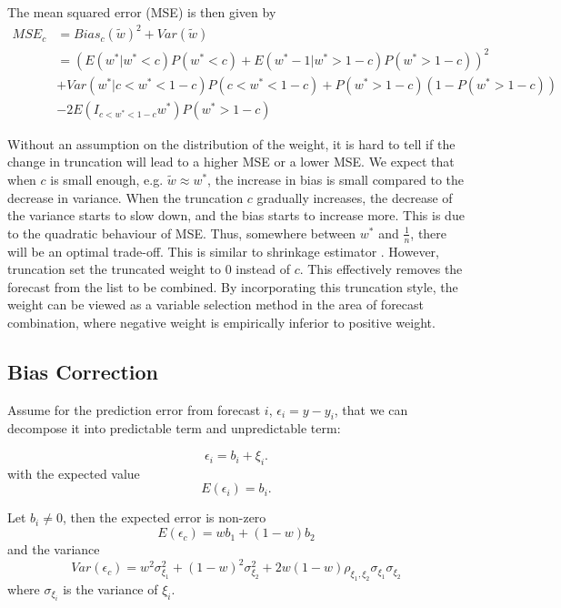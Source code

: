 \documentclass[11pt]{article}
\begin{document}
The mean squared error (MSE) is then given by 
\begin{equation}
\label{eqn: MSE trunc}
\begin{aligned}
MSE_c &= Bias_c(\tilde{w})^2 + Var(\tilde{w})\\
&=(E(w^*|w^*<c)P(w^*<c) + E(w^*-1|w^*>1-c)P(w^*>1-c))^2 \\
&+ Var(w^*|c<w^*<1-c)P(c<w^*<1-c) + P(w^*>1-c)(1-P(w^*>1-c)) \\
&- 2E(I_{c<w^*<1-c}w^*)P(w^*>1-c)
\end{aligned}
\end{equation}

Without an assumption on the distribution of the weight, it is hard to tell if the change in truncation will lead to a higher MSE or a lower MSE. We expect that when $c$ is small enough, e.g. $\tilde{w}\approx w^*$, the increase in bias is small compared to the decrease in variance. When the truncation $c$ gradually increases, the decrease of the variance starts to slow down, and the bias starts to increase more. This is due to the quadratic behaviour of MSE. Thus, somewhere between $w^*$ and $\frac{1}{n}$, there will be an optimal trade-off. This is similar to shrinkage estimator \citep{James1961}. However, truncation set the truncated weight to 0 instead of $c$. This effectively removes the forecast from the list to be combined. By incorporating this truncation style, the weight can be viewed as a variable selection method in the area of forecast combination, where negative weight is empirically inferior to positive weight. 

\subsection{Bias Correction}\label{bias-correction}

Assume for the prediction error from forecast \(i\),
\(\epsilon_i = y - y_i\), that we can decompose it into predictable term
and unpredictable term:

\begin{equation}
\label{eqn: w bias assumption}
\epsilon_i = b_i + \xi_i. 
\end{equation}
with the expected value
\begin{equation}
\label{eqn: bias estimate}
E(\epsilon_i) = b_i.
\end{equation}

Let $b_i \neq 0$, then the expected error is non-zero
\begin{equation}
E(\epsilon_c) = wb_1+(1-w)b_2
\end{equation}
and the variance
\begin{equation}
Var(\epsilon_c) = w^2\sigma^2_{\xi_1} + (1-w)^2\sigma^2_{\xi_2} + 2w(1-w)\rho_{\xi_1,\xi_2}\sigma_{\xi_1}\sigma_{\xi_2}
\end{equation}
where $\sigma_{\xi_i}$ is the variance of $\xi_i$.
\end{document}
